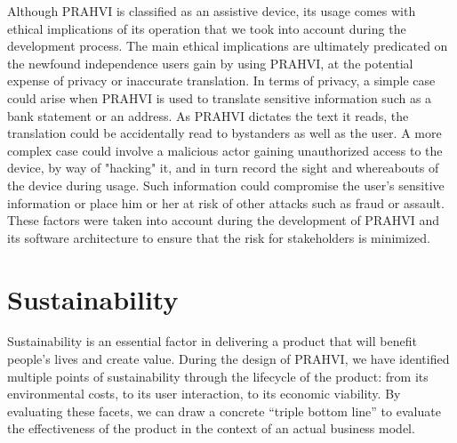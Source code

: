 	Although PRAHVI is classified as an assistive device, its usage comes with ethical implications of its operation that we took into account during the development process. The main ethical implications are ultimately predicated on the newfound independence users gain by using PRAHVI, at the potential expense of privacy or inaccurate translation. In terms of privacy, a simple case could arise when PRAHVI is used to translate sensitive information such as a bank statement or an address. As PRAHVI dictates the text it reads, the translation could be accidentally read to bystanders as well as the user. A more complex case could involve a malicious actor gaining unauthorized access to the device, by way of "hacking" it, and in turn record the sight and whereabouts of the device during usage. Such information could compromise the user's sensitive information or place him or her at risk of other attacks such as fraud or assault. These factors were taken into account during the development of PRAHVI and its software architecture to ensure that the risk for stakeholders is minimized.

\chapter{Sustainability}
	Sustainability is an essential factor in delivering a product that will benefit people's lives and create value. During the design of PRAHVI, we have identified multiple points of sustainability through the lifecycle of the product: from its environmental costs, to its user interaction, to its economic viability. By evaluating these facets, we can draw a concrete “triple bottom line” to evaluate the effectiveness of the product in the context of an actual business model.
	
